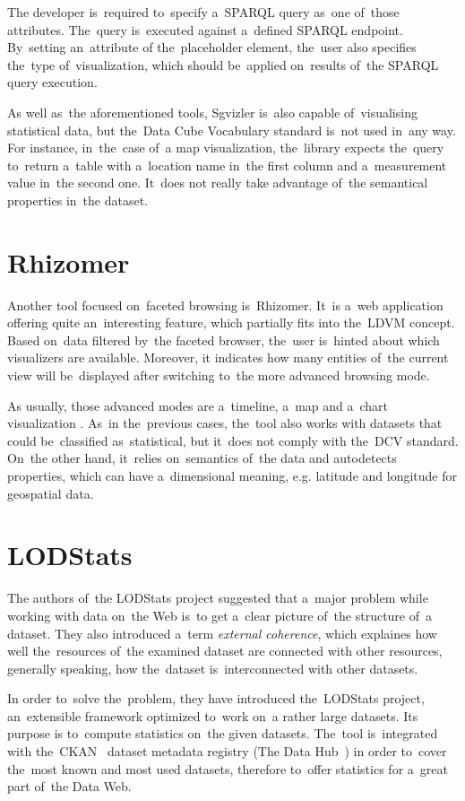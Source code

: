 The developer is~required to~specify a~SPARQL query as~one of~those attributes. The~query is~executed against a~defined SPARQL endpoint. By~setting an~attribute of
the~placeholder element, the~user also specifies the~type of~visualization, which 
should be~applied on~results of~the SPARQL query execution.

As well as~the aforementioned tools, Sgvizler is~also capable of~visualising statistical data, 
but the~Data Cube Vocabulary standard is~not used in~any way. For instance, in~the~case of~a map visualization, the~library expects the~query to~return a~table 
with a~location name in~the first column and a~measurement value in~the second 
one. It~does not really take advantage of~the semantical properties in~the 
dataset.

\section{Rhizomer}
Another tool focused on~faceted browsing is~Rhizomer. It~is a~web application 
offering quite an~interesting feature, which partially fits into the~LDVM 
concept. Based on~data filtered by~the faceted browser, the~user is~hinted about
which visualizers are available. Moreover, 
it indicates how many entities of~the current view will be~displayed after 
switching to~the more advanced browsing mode.

As usually, those advanced modes are a~timeline, a~map and a~chart visualization . As~in the~previous cases, the~tool also works with datasets that could be~classified as~statistical, but it~does not comply with the~DCV standard. On~the 
other hand, it~relies on~semantics of~the data and autodetects properties, 
which can have a~dimensional meaning, e.g. latitude and longitude for geospatial data.

\section{LODStats}
The authors of~the LODStats project suggested that a~major 
problem while working with data on~the Web is~to get a~clear picture of~the 
structure of~a dataset. They also introduced a~term \emph{external coherence},
which explaines how well the~resources of~the examined dataset are connected with 
other resources, generally speaking, how the~dataset is~interconnected with 
other datasets.

In order to~solve the~problem, they have introduced the~LODStats project, an~extensible framework optimized to~work on~a rather large datasets. Its purpose 
is to~compute statistics on~the given datasets. The~tool is~integrated with the~CKAN~\cite{ckan} dataset metadata registry (The Data Hub~\cite{thedatahub})
in order to~cover the~most known and 
most used datasets, therefore to~offer statistics for a~great part of~the Data 
Web.

